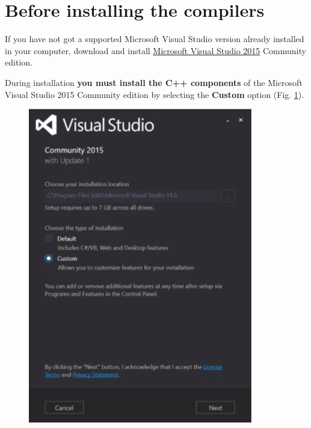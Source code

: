 \documentclass[10pt,a4paper,oneside]{article}
\begin{document}
\section*{Before installing the compilers}
If you have not got a supported Microsoft Visual Studio version already installed in your computer, download and install \href{https://www.microsoft.com/en-us/download/details.aspx?id=48146}{Microsoft Visual Studio 2015} Community edition. 

During installation \textbf{you must install the C++ components} of the Microsoft Visual Studio 2015 Community edition by selecting the \textbf{Custom} option (Fig. \ref{fig:VS1}).
\begin{figure}[!ht]
\centering
\includegraphics[scale=0.45]{VS1.png}
\caption{}
\label{fig:VS1}
\end{figure}
\end{document}
